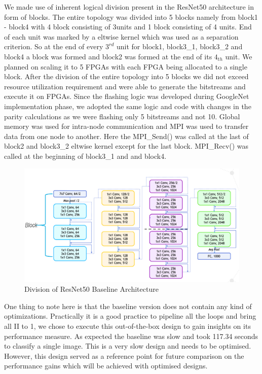 We made use of inherent logical division present in the ResNet50 architecture in form of blocks. The entire topology was divided into 5 blocks namely from block1 - block4 with 4 block consisting of 3units and 1 block consisting of 4 units. End of each unit was marked by a eltwise kernel which was used as a separation criterion. So at the end of every $3^{rd}$ unit for block1, block3\_1, block3\_2 and block4 a block was formed and block2 was formed at the end of its $4_{th}$ unit. We planned on scaling it to 5 FPGAs with each FPGA being allocated to a  single block. 
After the division of the entire topology into 5 blocks we did not exceed resource utilization requirement and were able to generate the bitstreams and execute it on FPGAs. Since the flashing logic was developed during GoogleNet implementation phase, we adopted the same logic and code with changes in the parity calculations as we were flashing only 5 bitstreams and not 10. 
Global memory was used for intra-node communication and MPI was used to transfer data from one node to another. Here the MPI\_Send() was called at the last of block2 and block3\_2 eltwise kernel except for the last block. MPI\_Recv() was called at the beginning of block3\_1 and and block4.
\begin{figure}[!htb]
  \includegraphics[width=\textwidth,height=\textheight,keepaspectratio]{img/ResNet_division.png}
  \caption{Division of ResNet50 Baseline Architecture}
  \label{fig:ResNet50_baseline_division}
\end{figure}
\newline
One thing to note here is that the baseline version does not contain any kind of optimizations. Practically it is a good practice to pipeline all the loops and bring all II to 1, we chose to execute this out-of-the-box design to gain insights on its performance measure.
As expected the baseline was slow and took 117.34 seconds to classify a single image. This is a very slow design and needs to be optimised. However, this design served as a reference point for future comparison on the performance gains which will be achieved with optimised designs.
